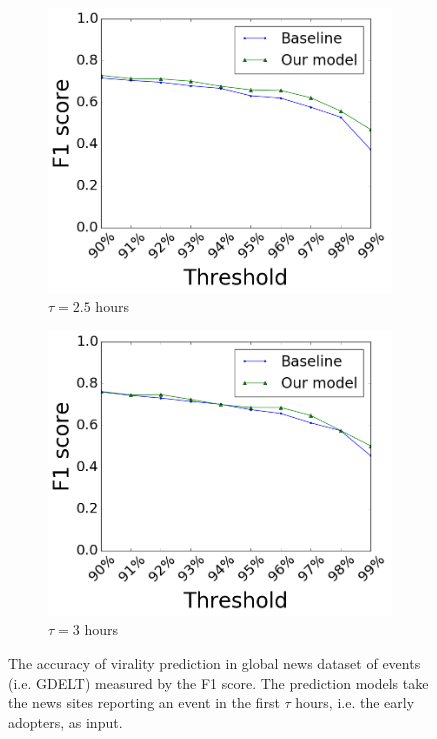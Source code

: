 \begin{figure}[t]
\begin{subfigure}{.32\textwidth}
\centering
\includegraphics[width=.99\linewidth]{img/chap3/gdelt_150_mins.png}
\caption{$\tau=2.5$ hours}\label{fig:gdelt5}
\end{subfigure}
\begin{subfigure}{.32\textwidth}
\centering
\includegraphics[width=.99\linewidth]{img/chap3/gdelt_180_mins.png}
\caption{$\tau=3$ hours}\label{fig:gdelt6}
\end{subfigure}

\caption{The accuracy of virality prediction in global news dataset of events (i.e. GDELT) measured by the F1 score. The prediction models take the news sites reporting an event in the first $\tau$ hours, i.e. the early adopters, as input.}
\label{fig:gdelt_prediction}
\end{figure}

